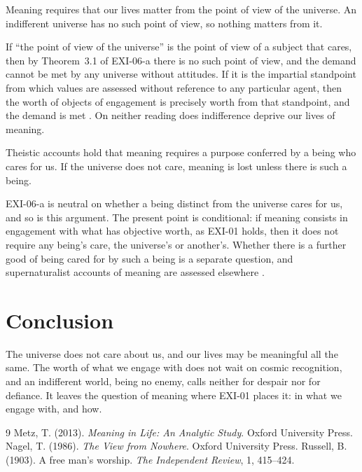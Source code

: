 \documentclass{situationist-preprint}
\begin{document}
\begin{objection}
Meaning requires that our lives matter from the point of view of the universe. An indifferent universe has no such point of view, so nothing matters from it.
\end{objection}

\begin{reply}
If \enquote{the point of view of the universe} is the point of view of a subject that cares, then by Theorem~3.1 of EXI-06-a there is no such point of view, and the demand cannot be met by any universe without attitudes. If it is the impartial standpoint from which values are assessed without reference to any particular agent, then the worth of objects of engagement is precisely worth from that standpoint, and the demand is met \citep{Nagel1986}. On neither reading does indifference deprive our lives of meaning.
\end{reply}

\begin{objection}
Theistic accounts hold that meaning requires a purpose conferred by a being who cares for us. If the universe does not care, meaning is lost unless there is such a being.
\end{objection}

\begin{reply}
EXI-06-a is neutral on whether a being distinct from the universe cares for us, and so is this argument. The present point is conditional: if meaning consists in engagement with what has objective worth, as EXI-01 holds, then it does not require any being's care, the universe's or another's. Whether there is a further good of being cared for by such a being is a separate question, and supernaturalist accounts of meaning are assessed elsewhere \citep{Metz2013}.
\end{reply}

\section{Conclusion}

The universe does not care about us, and our lives may be meaningful all the same. The worth of what we engage with does not wait on cosmic recognition, and an indifferent world, being no enemy, calls neither for despair nor for defiance. It leaves the question of meaning where EXI-01 places it: in what we engage with, and how.

\begin{thebibliography}{9}\small
{} Metz, T. (2013). \emph{Meaning in Life: An Analytic Study}. Oxford University Press.
 Nagel, T. (1986). \emph{The View from Nowhere}. Oxford University Press.
 Russell, B. (1903). A free man's worship. \emph{The Independent Review}, 1, 415--424.
\end{thebibliography}
\end{document}
